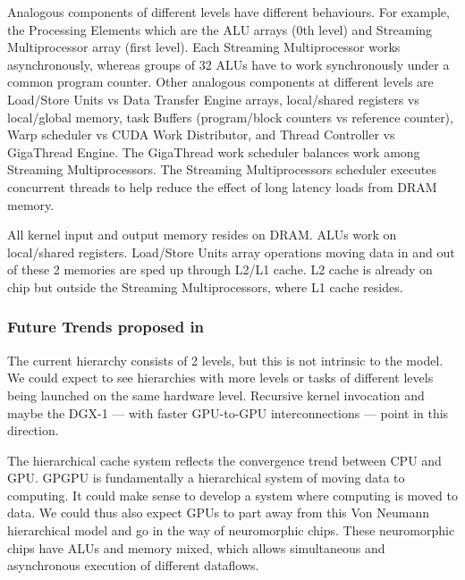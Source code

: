 Analogous components of different levels have different behaviours.
For example, the Processing Elements which are the ALU arrays (0th level) and Streaming Multiprocessor array (first level).
Each Streaming Multiprocessor works asynchronously, whereas groups of 32 ALUs have to work synchronously under a common program counter.
Other analogous components at different levels are Load/Store Units vs Data Transfer Engine arrays, local/shared registers vs local/global memory,
task Buffers (program/block counters vs reference counter), Warp scheduler vs CUDA Work Distributor, and Thread Controller vs GigaThread Engine.
The GigaThread work scheduler balances work among Streaming Multiprocessors.
The Streaming Multiprocessors scheduler executes concurrent threads to help reduce the effect of long latency loads from DRAM memory.

All kernel input and output memory resides on DRAM.
ALUs work on local/shared registers.
Load/Store Units array operations moving data in and out of these 2 memories are sped up through L2/L1 cache.
L2 cache is already on chip but outside the Streaming Multiprocessors, where L1 cache resides.

\subsubsection{Future Trends proposed in \cite{Hu:2016:CLG:2891449.2873053}}

The current hierarchy consists of 2 levels, but this is not intrinsic to the model.
We could expect to see hierarchies with more levels or tasks of different levels being launched on the same hardware level.
Recursive kernel invocation and maybe the DGX-1 --- with faster GPU-to-GPU interconnections --- point in this direction.

The hierarchical cache system reflects the convergence trend between CPU and GPU.
GPGPU is fundamentally a hierarchical system of moving data to computing.
It could make sense to develop a system where computing is moved to data.
We could thus also expect GPUs to part away from this Von Neumann hierarchical model and go in the way of neuromorphic chips.
These neuromorphic chips have ALUs and memory mixed, which allows simultaneous and asynchronous execution of different dataflows.
